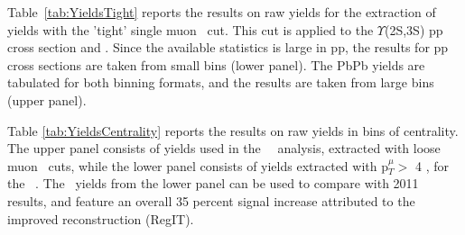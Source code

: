 Table~\ref{tab:YieldsTight} reports the results on raw yields for the extraction
of yields with the 'tight' single muon \pt\  cut. This cut is
applied to the $\Upsilon$(2S,3S) pp cross section and \RAA. Since
the available statistics is large in pp, the results for pp cross
sections are taken from
small bins (lower panel). The PbPb yields are tabulated for both binning formats,
and the \RAA results are taken from large bins (upper panel).

Table \ref{tab:YieldsCentrality} reports the results on raw yields in
bins of centrality. The upper panel consists of yields used in the \PgUa\
\RAA\ analysis, extracted with loose muon \pt\  cuts, while the
lower panel consists of yields extracted with p$^{\mu}_{T} >$ 4 \GeVc,
for the \PgUb\ \RAA. The \PgUa\ yields from the lower panel can be used to
compare with 2011 results, and feature an overall 35 percent signal
increase attributed to the improved reconstruction (RegIT).


